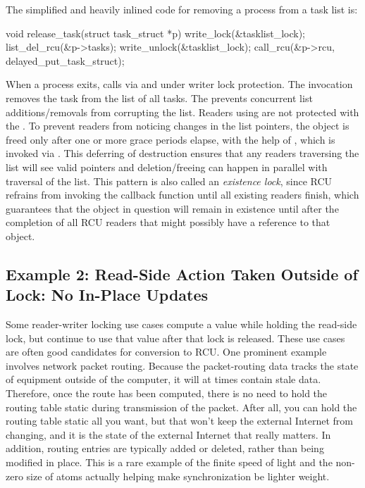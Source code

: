 The simplified and heavily inlined code for removing a process from a
task list is:

\begin{VerbatimU}
	void release_task(struct task_struct *p)
	{
		write_lock(&tasklist_lock);
		list_del_rcu(&p->tasks);
		write_unlock(&tasklist_lock);
		call_rcu(&p->rcu, delayed_put_task_struct);
	}
\end{VerbatimU}

When a process exits,  calls 
via  and  under 
writer lock protection.
The  invocation removes
the task from the list of all tasks.
The 
prevents concurrent list additions/removals from corrupting the
list.
Readers using  are not protected with the
.
To prevent readers from noticing changes in the list
pointers, the  object is freed only after one or more
grace periods elapse, with the help of , which is invoked via
.
This deferring of destruction ensures that
any readers traversing the list will see valid  pointers
and deletion/freeing can happen in parallel with traversal of the list.
This pattern is also called an \emph{existence lock}, since RCU refrains
from invoking the  callback function until
all existing readers finish, which guarantees that the 
object in question will remain in existence until after the completion
of all RCU readers that might possibly have a reference to that object.


\subsection{Example 2: Read-Side Action Taken Outside of Lock: No In-Place Updates}

Some reader-writer locking use cases compute a value while holding
the read-side lock, but continue to use that value after that lock is
released.
These use cases are often good candidates for conversion
to RCU\@.
One prominent example involves network packet routing.
Because the packet-routing data tracks the state of equipment outside
of the computer, it will at times contain stale data.
Therefore, once
the route has been computed, there is no need to hold the routing table
static during transmission of the packet.
After all, you can hold the
routing table static all you want, but that won't keep the external
Internet from changing, and it is the state of the external Internet
that really matters.
In addition, routing entries are typically added
or deleted, rather than being modified in place.
This is a rare example
of the finite speed of light and the non-zero size of atoms actually
helping make synchronization be lighter weight.


